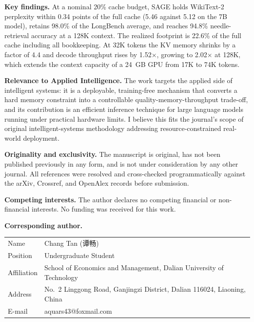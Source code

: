 \documentclass[11pt,a4paper]{article}
\begin{document}
\vspace{0.6em}

\noindent\textbf{Key findings.} At a nominal 20\% cache budget, SAGE
holds WikiText-2 perplexity within 0.34 points of the full cache
(5.46 against 5.12 on the 7B model), retains 98.0\% of the LongBench
average, and reaches 94.8\% needle-retrieval accuracy at a 128K
context. The realized footprint is 22.6\% of the full cache including
all bookkeeping. At 32K tokens the KV memory shrinks by a factor of
4.4 and decode throughput rises by 1.52$\times$, growing to
2.02$\times$ at 128K, which extends the context capacity of a 24~GB
GPU from 17K to 74K tokens.

\vspace{0.6em}

\noindent\textbf{Relevance to Applied Intelligence.} The work targets
the applied side of intelligent systems: it is a deployable,
training-free mechanism that converts a hard memory constraint into a
controllable quality-memory-throughput trade-off, and its contribution
is an efficient inference technique for large language models running
under practical hardware limits. I believe this fits the journal's
scope of original intelligent-systems methodology addressing
resource-constrained real-world deployment.

\vspace{0.6em}

\noindent\textbf{Originality and exclusivity.} The manuscript is
original, has not been published previously in any form, and is not
under consideration by any other journal. All references were resolved
and cross-checked programmatically against the arXiv, Crossref, and
OpenAlex records before submission.

\vspace{0.6em}

\noindent\textbf{Competing interests.} The author declares no
competing financial or non-financial interests. No funding was
received for this work.

\vspace{0.6em}

\noindent\textbf{Corresponding author.}

\vspace{0.3em}
\begin{tabular}{@{}ll@{}}
Name      & Chang Tan ({\cjkfont 谭畅}) \\
Position  & Undergraduate Student \\
Affiliation & School of Economics and Management, Dalian University
              of Technology \\
Address   & No.~2 Linggong Road, Ganjingzi District, Dalian 116024,
              Liaoning, China \\
E-mail    & aquars43@foxmail.com \\
\end{tabular}
\end{document}
